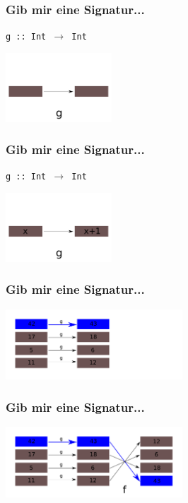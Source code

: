 \documentclass{beamer}
\begin{document}
\begin{frame}
\frametitle{Gib mir eine Signatur...}
\begin{center}
\texttt{g :: Int $\rightarrow$ Int}

\includegraphics[width=150px]{g-function-blank}
\end{center}
\end{frame}

\begin{frame}
\frametitle{Gib mir eine Signatur...}
\begin{center}
\texttt{g :: Int $\rightarrow$ Int}

\includegraphics[width=150px]{g-function}
\end{center}
\end{frame}

\begin{frame}
\frametitle{Gib mir eine Signatur...}

\begin{center}
\includegraphics[width=250px]{mapg}
\end{center}
\end{frame}

\begin{frame}
\frametitle{Gib mir eine Signatur...}
\begin{center}
\includegraphics[width=250px]{mapgf}
\end{center}
\end{frame}
\end{document}
